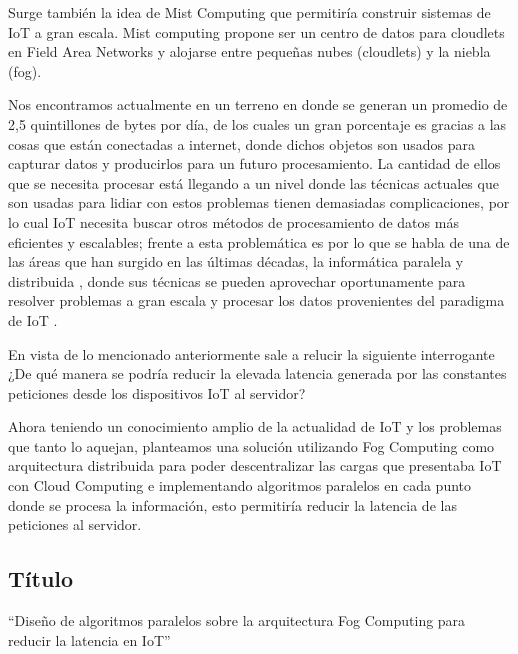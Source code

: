 \vskip 0.3cm
Surge también la idea de Mist Computing \citep{uehara2017,yogi2017} que permitiría construir sistemas de IoT a gran escala. Mist computing propone ser un centro de datos para cloudlets en Field Area Networks y alojarse entre pequeñas nubes (cloudlets) y la niebla (fog).\par
\vskip 0.3cm
Nos encontramos actualmente en un terreno en donde se generan un promedio de 2,5 quintillones de bytes por día, de los cuales un gran porcentaje es gracias a las cosas que están conectadas a internet, donde dichos objetos son usados para capturar datos y producirlos para un futuro procesamiento. La cantidad de ellos que se necesita procesar está llegando a un nivel donde las técnicas actuales que son usadas para lidiar con estos problemas tienen demasiadas complicaciones, por lo cual IoT necesita buscar otros métodos de procesamiento de datos más eficientes y escalables; frente a esta problemática es por lo que se habla de una de las áreas que han surgido en las últimas décadas, la informática paralela y distribuida \citep{murazzo2017}, donde sus técnicas se pueden aprovechar oportunamente para resolver problemas a gran escala y procesar los datos provenientes del paradigma de IoT \citep{piccialli2018}.\par
\vskip 0.3cm
En vista de lo mencionado anteriormente sale a relucir la siguiente interrogante ¿De qué manera se podría reducir la elevada latencia generada por las constantes peticiones desde los dispositivos IoT al servidor?\par
\vskip 0.8cm
Ahora teniendo un conocimiento amplio de la actualidad de IoT y los problemas que tanto lo aquejan, planteamos una solución utilizando Fog Computing como arquitectura distribuida para poder descentralizar las cargas que presentaba IoT con Cloud Computing e implementando algoritmos paralelos en cada punto donde se procesa la información, esto permitiría reducir la latencia de las peticiones al servidor.\par


\subsection{Título}
“Diseño de algoritmos paralelos sobre la arquitectura Fog Computing para reducir la latencia en IoT”

